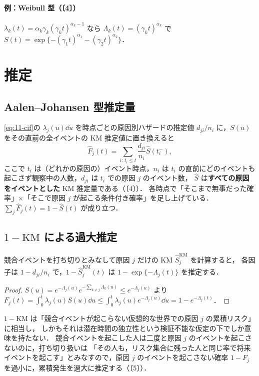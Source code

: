 \paragraph{例：Weibull 型（〔4〕）}
$\lambda_k(t)=\alpha_k\gamma_k(\gamma_kt)^{\alpha_k-1}$ なら $\Lambda_k(t)=(\gamma_kt)^{\alpha_k}$ で $S(t)=\exp\{-(\gamma_1t)^{\alpha_1}-(\gamma_2t)^{\alpha_2}\}$．

\section{推定}\label{sec:11-est}
\subsection{Aalen--Johansen 型推定量}\label{subsec:11-aj}
\Hissu\cref{eq:11-cif}の $\lambda_j(u)\dd u$ を時点ごとの原因別ハザードの推定値 $d_{ji}/n_i$ に，$S(u)$ をその直前の全イベントの KM 推定値に置き換えると
\begin{equation}
\hat F_j(t)=\sum_{i:\,t_i\le t}\frac{d_{ji}}{n_i}\hat S(t_i^-),\label{eq:11-aj}
\end{equation}
ここで $t_i$ は（どれかの原因の）イベント時点，$n_i$ は $t_i$ の直前にどのイベントも起こさず観察中の人数，$d_{ji}$ は $t_i$ での原因 $j$ のイベント数，
$\hat S$ は\textbf{すべての原因をイベントとした} KM 推定量である（〔4〕）．
各時点で「そこまで無事だった確率」×「そこで原因 $j$ が起こる条件付き確率」を足し上げている．
$\sum_j\hat F_j(t)=1-\hat S(t)$ が成り立つ．

\subsection{\texorpdfstring{$1-\mathrm{KM}$}{1−KM} による過大推定}\label{subsec:11-bias}
\Hinshutsu 競合イベントを打ち切りとみなして原因 $j$ だけの KM $\hat S_j^{\mathrm{KM}}$ を計算すると，
各因子は $1-d_{ji}/n_i$ で，$1-\hat S_j^{\mathrm{KM}}(t)$ は $1-\exp\{-\Lambda_j(t)\}$ を推定する．
\begin{proof}
$S(u)=e^{-\Lambda_j(u)}e^{-\sum_{k\ne j}\Lambda_k(u)}\le e^{-\Lambda_j(u)}$ より
$F_j(t)=\int_0^t\lambda_j(u)S(u)\dd u\le\int_0^t\lambda_j(u)e^{-\Lambda_j(u)}\dd u=1-e^{-\Lambda_j(t)}$．
\end{proof}
$1-\mathrm{KM}$ は「競合イベントが起こらない仮想的な世界での原因 $j$ の累積リスク」に相当し，
しかもそれは潜在時間の独立性という検証不能な仮定の下でしか意味を持たない．
競合イベントを起こした人は二度と原因 $j$ のイベントを起こさないのに，打ち切り扱いは
「その人も，リスク集合に残った人と同じ率で将来イベントを起こす」とみなすので，原因 $j$ のイベントを起こさない確率 $1-F_j$ を過小に，累積発生を過大に推定する（〔5〕）．


